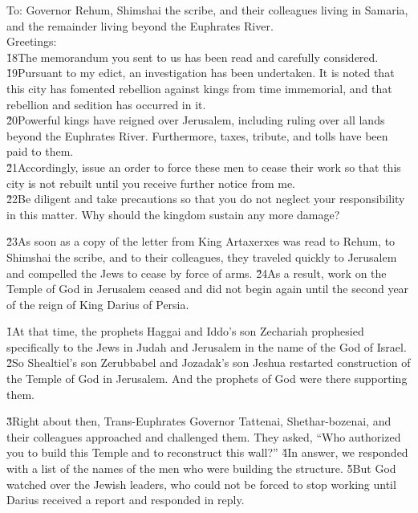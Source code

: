 \begin{poetry}
\poeml To: Governor Rehum, Shimshai the scribe, and their colleagues living in Samaria, and the remainder living beyond the Euphrates River. \\
\poeml Greetings: \\
\poeml \v{18}The memorandum you sent to us has been read and carefully considered. \v{19}Pursuant to my edict, an investigation has been undertaken. It is noted that this city has fomented rebellion against kings from time immemorial, and that rebellion and sedition has occurred in it. \\
\poeml \v{20}Powerful kings have reigned over Jerusalem, including ruling over all lands beyond the Euphrates River. Furthermore, taxes, tribute, and tolls have been paid to them. \\
\poeml \v{21}Accordingly, issue an order to force these men to cease their work so that this city is not rebuilt until you receive further notice from me. \\
\poeml \v{22}Be diligent and take precautions so that you do not neglect your responsibility in this matter. Why should the kingdom sustain any more damage?
\end{poetry}

\v{23}As soon as a copy of the letter from King Artaxerxes was read to Rehum, to Shimshai the scribe, and to their colleagues, they traveled quickly to Jerusalem and compelled the Jews to cease by force of arms. \v{24}As a result, work on the Temple of God in Jerusalem ceased and did not begin again until the second year of the reign of King Darius of Persia.

\v{1}At that time, the prophets Haggai and Iddo's son Zechariah prophesied specifically to the Jews in Judah and Jerusalem in the name of the God of Israel. \v{2}So Shealtiel's son Zerubbabel and Jozadak's son Jeshua restarted construction of the Temple of God in Jerusalem. And the prophets of God were there supporting them.

\v{3}Right about then, Trans-Euphrates Governor Tattenai, Shethar-bozenai, and their colleagues approached and challenged them. They asked, ``Who authorized you to build this Temple and to reconstruct this wall?'' \v{4}In answer, we responded with a list of the names of the men who were building the structure. \v{5}But God watched over the Jewish leaders, who could not be forced to stop working until Darius received a report and responded in reply.

